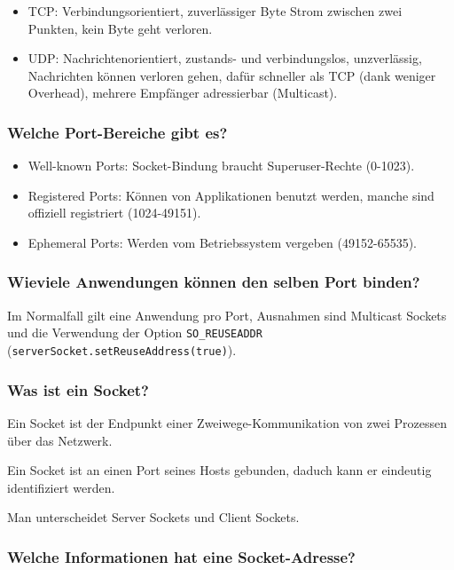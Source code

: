 \documentclass[10pt,a4paper]{scrartcl}
\begin{document}
\begin{itemize}
	\item TCP: Verbindungsorientiert, zuverlässiger Byte Strom zwischen zwei Punkten, kein Byte geht
		verloren.
	\item UDP: Nachrichtenorientiert, zustands- und verbindungslos, unzverlässig, Nachrichten können
		verloren gehen, dafür schneller als TCP (dank weniger Overhead), mehrere Empfänger adressierbar
		(Multicast).
\end{itemize}
  
\subsubsection{Welche Port-Bereiche gibt es?}

\begin{itemize}
	\item Well-known Ports: Socket-Bindung braucht Superuser-Rechte (0-1023).
	\item Registered Ports: Können von Applikationen benutzt werden, manche sind offiziell registriert
		(1024-49151).
	\item Ephemeral Ports: Werden vom Betriebssystem vergeben (49152-65535).
\end{itemize}
  
\subsubsection{Wieviele Anwendungen können den selben Port binden?}

Im Normalfall gilt eine Anwendung pro Port, Ausnahmen sind Multicast Sockets und die Verwendung der
Option \texttt{SO\_REUSEADDR} (\texttt{serverSocket.setReuseAddress(true)}).
 
\subsubsection{Was ist ein Socket?}

Ein Socket ist der Endpunkt einer Zweiwege-Kommunikation von zwei Prozessen über das Netzwerk.

Ein Socket ist an einen Port seines Hosts gebunden, daduch kann er eindeutig identifiziert werden.

Man unterscheidet Server Sockets und Client Sockets.
 
\subsubsection{Welche Informationen hat eine Socket-Adresse?}
\end{document}
